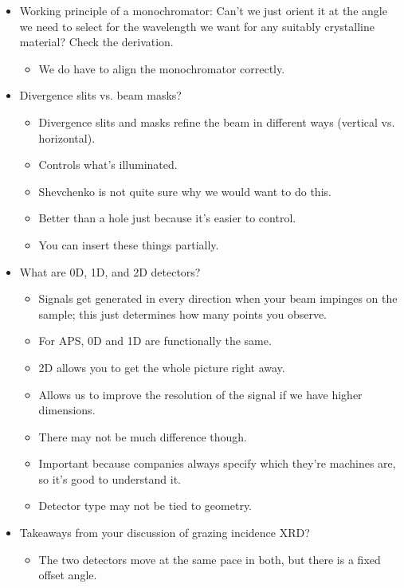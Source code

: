 \documentclass[../notes.tex]{subfiles}
\begin{document}
\begin{itemize}
\begin{itemize}
    \end{itemize}
    \item Working principle of a monochromator: Can't we just orient it at the angle we need to select for the wavelength we want for any suitably crystalline material? Check the derivation.
    \begin{itemize}
        \item We do have to align the monochromator correctly.
    \end{itemize}
    \item Divergence slits vs. beam masks?
    \begin{itemize}
        \item Divergence slits and masks refine the beam in different ways (vertical vs. horizontal).
        \item Controls what's illuminated.
        \item Shevchenko is not quite sure why we would want to do this.
        \item Better than a hole just because it's easier to control.
        \item You can insert these things partially.
    \end{itemize}
    \item What are 0D, 1D, and 2D detectors?
    \begin{itemize}
        \item Signals get generated in every direction when your beam impinges on the sample; this just determines how many points you observe.
        \item For APS, 0D and 1D are functionally the same.
        \item 2D allows you to get the whole picture right away.
        \item Allows us to improve the resolution of the signal if we have higher dimensions.
        \item There may not be much difference though.
        \item Important because companies always specify which they're machines are, so it's good to understand it.
        \item Detector type may not be tied to geometry.
    \end{itemize}
    \item Takeaways from your discussion of grazing incidence XRD?
    \begin{itemize}
        \item The two detectors move at the same pace in both, but there is a fixed offset angle.

\end{itemize}
\end{itemize}
\end{document}
